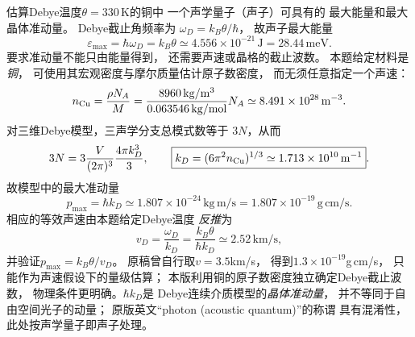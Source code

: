 估算Debye温度$\theta=330\,\mathrm K$的铜中
一个声学量子（声子）可具有的
最大能量和最大晶体准动量。
\exsolution
Debye截止角频率为
$\omega_D=k_B\theta/\hbar$，
故声子最大能量
\[
 \boxed{\varepsilon_{\max}=\hbar\omega_D=k_B\theta
 \simeq4.556\times10^{-21}\,\mathrm J
 =28.44\,\mathrm{meV}}.
\]
要求准动量不能只由能量得到，
还需要声速或晶格的截止波数。
本题给定材料是\emph{铜}，
可使用其宏观密度与摩尔质量估计原子数密度，
而无须任意指定一个声速：
\[
 n_{\rm Cu}=\frac{\rho N_A}{M}
 =\frac{8960\,\mathrm{kg/m^3}}
 {0.063546\,\mathrm{kg/mol}}N_A
 \simeq8.491\times10^{28}\,\mathrm{m^{-3}}.
\]
对三维Debye模型，三声学分支总模式数等于
$3N$，从而
\[
 3N=3\frac{V}{(2\pi)^3}\frac{4\pi k_D^3}{3},
 \qquad
 \boxed{k_D=(6\pi^2 n_{\rm Cu})^{1/3}
 \simeq1.713\times10^{10}\,\mathrm{m^{-1}}}.
\]
故模型中的最大准动量
\[
 \boxed{p_{\max}=\hbar k_D
 \simeq1.807\times10^{-24}\,\mathrm{kg\,m/s}
 =1.807\times10^{-19}\,\mathrm{g\,cm/s}}.
\]
相应的等效声速由本题给定Debye温度
\emph{反推}为
\[
 v_D=\frac{\omega_D}{k_D}
 =\frac{k_B\theta}{\hbar k_D}
 \simeq2.52\,\mathrm{km/s},
\]
并验证$p_{\max}=k_B\theta/v_D$。
\excheck 原稿曾自行取$v=3.5$km/s，
得到$1.3\times10^{-19}$g\,cm/s，
只能作为声速假设下的量级估算；
本版利用铜的原子数密度独立确定Debye截止波数，
物理条件更明确。$\hbar k_D$是
Debye连续介质模型的\emph{晶体准动量}，
并不等同于自由空间光子的动量；
原版英文“photon (acoustic quantum)”的称谓
具有混淆性，此处按声学量子即声子处理。

